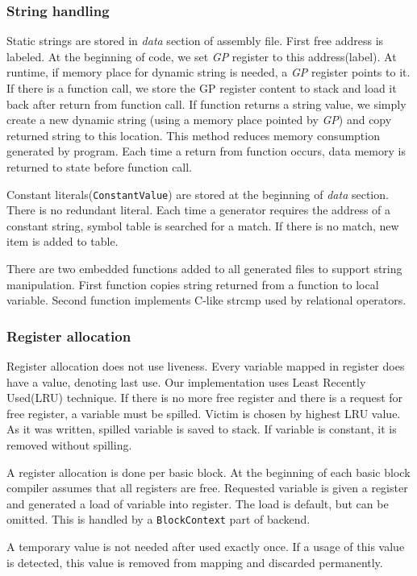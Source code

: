\documentclass[12pt]{article}
\begin{document}
\subsubsection{String handling}
Static strings are stored in \textit{data} section of assembly file. First free address is labeled. At the beginning of code, we set \textit{GP} register to this address(label). At runtime, if memory place for dynamic string is needed, a \textit{GP} register points to it. If there is a function call, we store the GP register content to stack and load it back after return from function call. If function returns a string value, we simply create a new dynamic string (using a memory place pointed by \textit{GP}) and copy returned string to this location. This method reduces memory consumption generated by program. Each time a return from function occurs, data memory is returned to state before function call.

Constant literals(\texttt{ConstantValue}) are stored at the beginning of \textit{data} section. There is no redundant literal. Each time a generator requires the address of a constant string, symbol table is searched for a match. If there is no match, new item is added to table. 

There are two embedded functions added to all generated files to support string manipulation. First function copies string returned from a function to local variable. Second function implements C-like strcmp used by relational operators.

\subsubsection{Register allocation}
Register allocation does not use liveness. Every variable mapped in register does have a value, denoting last use. Our implementation uses Least Recently Used(LRU) technique. If there is no more free register and there is a request for free register, a variable must be spilled. Victim is chosen by highest LRU value. As it was written, spilled variable is saved to stack. If variable is constant, it is removed without spilling.

A register allocation is done per basic block. At the beginning of each basic block compiler assumes that all registers are free. Requested variable is given a register and generated a load of variable into register. The load is default, but can be omitted. This is handled by a \texttt{BlockContext} part of backend. 

A temporary value is not needed after used exactly once. If a usage of this value is detected, this value is removed from mapping and discarded permanently.
\end{document}
